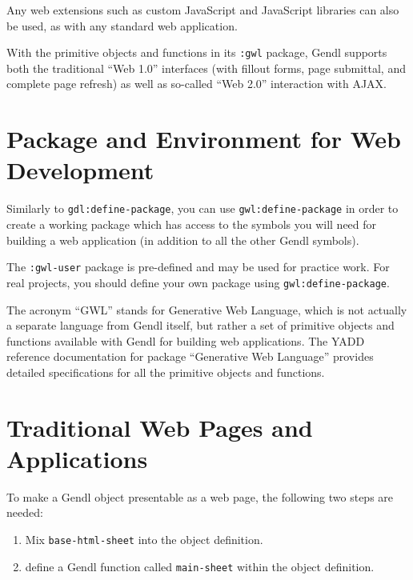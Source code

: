 \documentclass [11pt]{book}
\begin{document}
Any web extensions such as custom JavaScript and JavaScript libraries
can also be used, as with any standard web application.



With the primitive objects and functions in its \texttt{:gwl} package, Gendl supports both the traditional ``Web 1.0''
interfaces (with fillout forms, page submittal, and complete page
refresh) as well as so-called ``Web 2.0'' interaction with AJAX.



\section{Package and Environment for Web Development}

\label{sec:packageandenvironmentforwebdevelopment}



Similarly to \texttt{gdl:define-package}, you can use \texttt{gwl:define-package} in order to create a working package which has
access to the symbols you will need for building a web application (in
addition to all the other Gendl symbols).



The \texttt{:gwl-user} package is pre-defined and may be used for practice
work. For real projects, you should define your own package using \texttt{gwl:define-package}.



The acronym ``GWL'' stands for Generative Web Language, which is not
actually a separate language from Gendl itself, but rather a set of
primitive objects and functions available with Gendl for building web
applications. The YADD reference documentation for package
``Generative Web Language'' provides detailed specifications for all
the primitive objects and functions.



\section{Traditional Web Pages and Applications}

\label{sec:traditionalwebpagesandapplications}



To make a Gendl object presentable as a web page, the following two
steps are needed:

\begin{enumerate}

\item Mix \texttt{base-html-sheet} into the object definition.

\item define a Gendl function called \texttt{main-sheet} within the object definition.

\end{enumerate}
\end{document}
